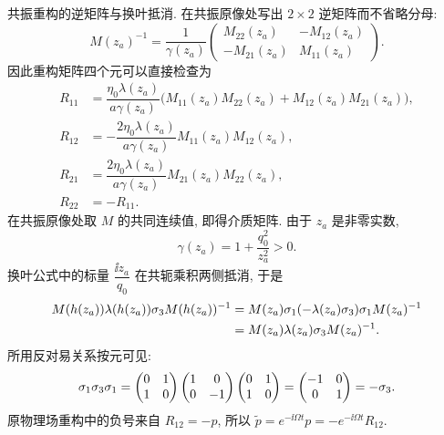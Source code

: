 \par\smallskip\noindent 共振重构的逆矩阵与换叶抵消.\quad
在共振原像处写出 $2\times2$ 逆矩阵而不省略分母:
\begin{equation*}
M(z_a)^{-1}
=\dfrac{1}{\gamma(z_a)}
\begin{pmatrix}
M_{22}(z_a)&-M_{12}(z_a)\\
-M_{21}(z_a)&M_{11}(z_a)
\end{pmatrix}.
\end{equation*}
因此重构矩阵四个元可以直接检查为
\begin{equation*}
\begin{aligned}
R_{11}
&=\dfrac{\eta_0\lambda(z_a)}{a\gamma(z_a)}
\bigl(M_{11}(z_a)M_{22}(z_a)+M_{12}(z_a)M_{21}(z_a)\bigr),\\
R_{12}
&=-\dfrac{2\eta_0\lambda(z_a)}{a\gamma(z_a)}
M_{11}(z_a)M_{12}(z_a),\\
R_{21}
&=\dfrac{2\eta_0\lambda(z_a)}{a\gamma(z_a)}
M_{21}(z_a)M_{22}(z_a),\\
R_{22}&=-R_{11}.
\end{aligned}
\end{equation*}
在共振原像处取 $M$ 的共同连续值, 即得介质矩阵.
由于 $z_a$ 是非零实数,
\begin{equation*}
\gamma(z_a)=1+\dfrac{q_0^2}{z_a^2}>0.
\end{equation*}
换叶公式中的标量 $\dfrac{\ii z_a}{q_0}$ 在共轭乘积两侧抵消, 于是
\begin{equation*}
\begin{aligned}
M(h(z_a))\lambda(h(z_a))\sigma_3 M(h(z_a))^{-1}
&=M(z_a)\sigma_1(-\lambda(z_a)\sigma_3)\sigma_1M(z_a)^{-1}\\
&=M(z_a)\lambda(z_a)\sigma_3 M(z_a)^{-1}.
\end{aligned}
\end{equation*}
所用反对易关系按元可见:
\begin{equation*}
\sigma_1\sigma_3\sigma_1
=\begin{pmatrix}0&1\\1&0\end{pmatrix}
\begin{pmatrix}1&0\\0&-1\end{pmatrix}
\begin{pmatrix}0&1\\1&0\end{pmatrix}
=\begin{pmatrix}-1&0\\0&1\end{pmatrix}=-\sigma_3.
\end{equation*}
原物理场重构中的负号来自 $R_{12}=-p$, 所以
$\widetilde p=e^{-\ii\Omega t}p=-e^{-\ii\Omega t}R_{12}$.

